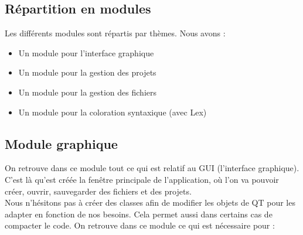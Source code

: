 \documentclass[a4paper,12pt]{article}
\begin{document}
	\subsection{Répartition en modules}
	
		Les différents modules sont répartis par thèmes. Nous avons :
		\begin{itemize}
			\item Un module pour l'interface graphique
			\item Un module pour la gestion des projets
			\item Un module pour la gestion des fichiers
			\item Un module pour la coloration syntaxique (avec Lex)
		\end{itemize}
	
	\subsection{Module graphique}
	
		On retrouve dans ce module tout ce qui est relatif au GUI (l'interface graphique).\\
		C'est là qu'est créée la fenêtre principale de l'application, où l'on va pouvoir créer, ouvrir, sauvegarder des fichiers et des projets.\\
		Nous n'hésitons pas à créer des classes afin de modifier les objets de QT pour les adapter en fonction de nos besoins. Cela permet aussi dans certains cas de compacter le code.
		On retrouve dans ce module ce qui est nécessaire pour :
	
\end{document}
